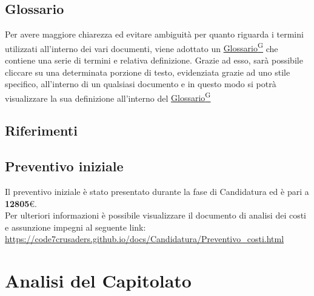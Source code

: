 \documentclass{article}
\begin{document}
    \subsection{Glossario}
    Per avere maggiore chiarezza ed evitare ambiguità per quanto riguarda i termini utilizzati all'interno dei vari documenti,
    viene adottato un \href{https://code7crusaders.github.io/docs/PB/documentazione_interna/glossario.html#glossario}{Glossario\textsuperscript{G}} che contiene una serie di termini e relativa definizione.
    Grazie ad esso, sarà possibile cliccare su una determinata porzione di testo, evidenziata grazie ad uno stile specifico,
    all'interno di un qualsiasi documento e in questo modo si potrà visualizzare la sua definizione all'interno
    del \href{https://code7crusaders.github.io/docs/PB/documentazione_interna/glossario.html#glossario}{Glossario\textsuperscript{G}}

    \subsection{Riferimenti}

    \subsection{Preventivo iniziale}
    Il preventivo iniziale è stato presentato durante la fase di Candidatura ed è pari a \textbf{12805}\euro.
    \\ Per ulteriori informazioni è possibile visualizzare il documento di analisi dei costi e assunzione impegni al seguente link:
    \\ \url{https://code7crusaders.github.io/docs/Candidatura/Preventivo_costi.html}




\newpage
\section{Analisi del Capitolato}
\end{document}
